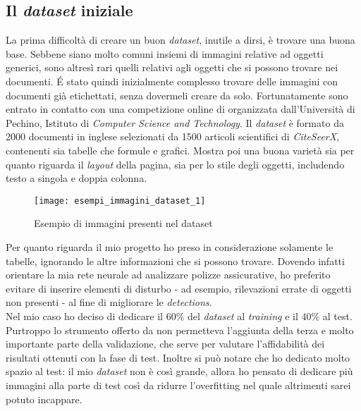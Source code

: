     \subsection{Il \textit{dataset} iniziale}
    La prima difficoltà di creare un buon \textit{dataset}, inutile a dirsi, è trovare una buona base. Sebbene siano molto comuni insiemi di immagini relative ad oggetti generici, sono altresì rari quelli relativi agli oggetti che si possono trovare nei documenti. \'E stato quindi inizialmente complesso trovare delle immagini con documenti già etichettati, senza dovermeli creare da solo.
    Fortunatamente sono entrato in contatto con una competizione online di \cite{site:ICDAR-2017-POD} organizzata dall'Università di Pechino, Istituto di \textit{Computer Science and Technology}\cite{site:comp-sci-peking}. Il \textit{dataset} è formato da 2000 documenti in inglese selezionati da 1500 articoli scientifici di \textit{CiteSeerX}\cite{site:cite-seer-x}, contenenti sia tabelle che formule e grafici. Mostra poi una buona varietà sia per quanto riguarda il \textit{layout} della pagina, sia per lo stile degli oggetti, includendo testo a singola e doppia colonna.
    \begin{figure}[H] 
        \centering
        \texttt{[image: esempi\_immagini\_dataset\_1]} 
        \caption{Esempio di immagini presenti nel dataset}
        \label{img:example_dataset_images}
    \end{figure} 
    Per quanto riguarda il mio progetto ho preso in considerazione solamente le tabelle, ignorando le altre informazioni che si possono trovare. Dovendo infatti orientare la mia rete neurale ad analizzare polizze assicurative, ho preferito evitare di inserire elementi di disturbo - ad esempio, rilevazioni errate di oggetti non presenti - al fine di migliorare le \textit{detections}.
    \medskip
    \\Nel mio caso ho deciso di dedicare il $60\%$ del \textit{dataset} al \textit{training} e il $40\%$ al test. Purtroppo lo strumento offerto da  non permetteva l'aggiunta della terza e molto importante parte della validazione, che serve per valutare l'affidabilità dei risultati ottenuti con la fase di test. Inoltre si può notare che ho dedicato molto spazio al test: il mio \textit{dataset} non è così grande, allora ho pensato di dedicare più immagini alla parte di test così da ridurre l'\gls{overfitting} nel quale altrimenti sarei potuto incappare.
    
